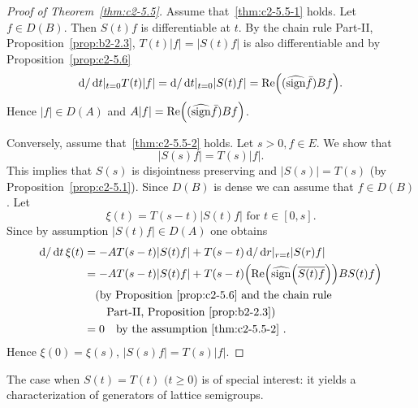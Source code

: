 \begin{proof}[Proof of Theorem~\ref{thm:c2-5.5}]
Assume that~\ref{thm:c2-5.5-1}   holds. 
Let $f \in D(B)$. 
Then $S(t)f$ is differentiable at $t$. 
By the chain rule Part-II, Proposition~\ref{prop:b2-2.3},
$T(t)|f| = |S(t)f|$ is also differentiable and by  Proposition~\ref{prop:c2-5.6}
\[
\diff{}/\dt|_{t=0} T(t)|f| = \diff{}/\dt|_{t=0} |S(t)f| = \Re\mleft((\widehat{\sign} \bar{f})Bf\mright) .
\]
Hence $|f| \in D(A)$ and $A|f| = \Re\mleft((\widehat{\sign} \bar{f})Bf\mright)$.

Conversely, assume that~\ref{thm:c2-5.5-2}   holds. 
Let $s > 0, f \in E$. 
We show that 
\[
|S(s)f| = T(s)|f| .
\]
This implies that $S(s)$ is disjointness preserving and $|S(s)| = T(s)$ (by Proposition~\ref{prop:c2-5.1}). 
Since $D(B)$ is dense we can assume that $f \in D(B)$. 
Let 
\[
\xi(t) = T(s-t)|S(t)f|  \text{ for } t \in [0,s] .
\]
Since by assumption $|S(t)f| \in D(A)$ one obtains
\begin{align*}
\diff{}/\dt \, \xi(t) &= -AT(s-t)|S(t)f| + T(s-t)\diff{}/\dr|_{r=t} |S(r)f|\\
&= -AT(s-t)|S(t)f| + T(s-t)\mleft(\Re\mleft(\widehat{\sign}  \mleft(\overline{S(t)f}\mright)\mright)BS(t)f\mright)\\
&\quad \text{(by Proposition~\ref{prop:c2-5.6} and the chain rule}\\
&\qquad \text{Part-II, Proposition~\ref{prop:b2-2.3})}\\
&= 0 \quad \text{by the assumption~\ref{thm:c2-5.5-2}  }.
\end{align*}
Hence $\xi(0) = \xi(s)$, \ie $|S(s)f| = T(s)|f|$.
\end{proof}
The case when $S(t) = T(t)$ $(t \geq 0$) is of special interest: it yields a characterization of generators of lattice semigroups.

